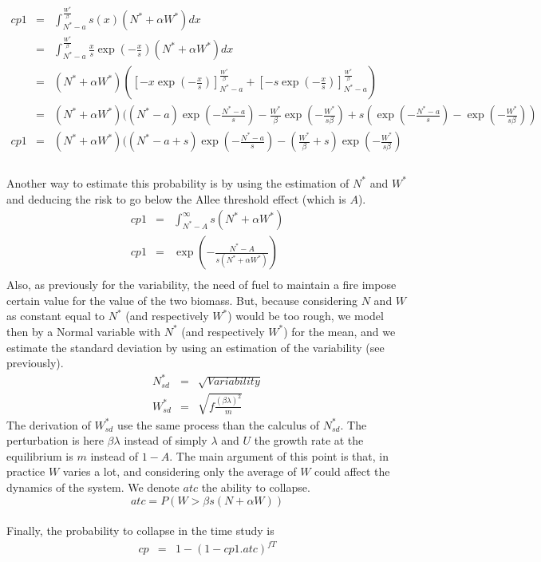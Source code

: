 \documentclass{article}
\begin{document}
\[
\begin{array}{rcl}
cp1 &=& \int_{N^*-a}^{\frac{W^*}{\beta}}s(x)(N^*+\alpha W^*)dx \\
&=& \int_{N^*-a}^{\frac{W^*}{\beta}} \frac{x}{s}\exp(-\frac{x}{s})(N^*+\alpha W^*)dx \\
&=& (N^*+\alpha W^*)([-x\exp(-\frac{x}{s})]_{N^*-a}^{\frac{W^*}{\beta}} +  [ -s\exp(-\frac{x}{s})]_{N^*-a}^{\frac{W^*}{\beta}}) \\
&=& (N^*+\alpha W^*)((N^*-a)\exp(-\frac{N^*-a}{s}) - \frac{W^*}{\beta}\exp(-\frac{W^*}{s\beta}) + s(\exp(-\frac{N^*-a}{s})- \exp(-\frac{W^*}{s\beta})) \\
cp1 &=& (N^*+\alpha W^*)((N^*-a+s)\exp(-\frac{N^*-a}{s}) - (\frac{W^*}{\beta}+s)\exp(-\frac{W^*}{s\beta}) \\
\end{array}
\]

\paragraph{}
Another way to estimate this probability is by using the estimation of $N^*$ and $W^*$ and deducing the risk to go below the Allee threshold effect (which is $A$). %
\[
\begin{array}{rcl}
cp1 & = & \int_{N^*-A}^{\infty} s(N^*+\alpha W^*) \\
cp1 & = & \exp(-\frac{N^*-A}{s(N^*+\alpha W^*)}) \\
\end{array}
\]
Also, as previously for the variability, the need of fuel to maintain a fire impose certain value for the value of the two biomass. But, because considering $N$ and $W$ as constant equal to $N^*$ (and respectively $W^*$) would be too rough, we model then by a Normal variable with $N^*$ (and respectively $W^*$) for the mean, and we estimate the standard deviation by using an estimation of the variability (see previously).
\[
\begin{array}{rcl}
N_{sd}^* & = & \sqrt{Variability} \\
W_{sd}^* & = & \sqrt{f\frac{(\beta \lambda)^2}{m}}
\end{array}
\]
The derivation of $W_{sd}^*$ use the same process than the calculus of $N_{sd}^*$. The perturbation is here $\beta \lambda$ instead of simply $\lambda$ and $U$ the growth rate at the equilibrium is $m$ instead of $1-A$. The main argument of this point is that, in practice $W$ varies a lot, and considering only the average of $W$ could affect the dynamics of the system. We denote $atc$ the ability to collapse.
\[
atc = P(W > \beta s (N+\alpha W))
\]
\\
Finally, the probability to collapse in the time study is 
\[
\begin{array}{rcl}
cp & = & 1-(1-cp1.atc)^{fT}
\end{array}
\]
\end{document}
